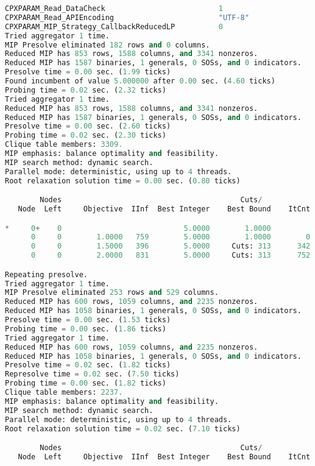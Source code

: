 \begin{lstlisting}[language=Python]
CPXPARAM_Read_DataCheck                          1
CPXPARAM_Read_APIEncoding                        "UTF-8"
CPXPARAM_MIP_Strategy_CallbackReducedLP          0
Tried aggregator 1 time.
MIP Presolve eliminated 182 rows and 0 columns.
Reduced MIP has 853 rows, 1588 columns, and 3341 nonzeros.
Reduced MIP has 1587 binaries, 1 generals, 0 SOSs, and 0 indicators.
Presolve time = 0.00 sec. (1.99 ticks)
Found incumbent of value 5.000000 after 0.00 sec. (4.60 ticks)
Probing time = 0.02 sec. (2.32 ticks)
Tried aggregator 1 time.
Reduced MIP has 853 rows, 1588 columns, and 3341 nonzeros.
Reduced MIP has 1587 binaries, 1 generals, 0 SOSs, and 0 indicators.
Presolve time = 0.00 sec. (2.60 ticks)
Probing time = 0.02 sec. (2.30 ticks)
Clique table members: 3309.
MIP emphasis: balance optimality and feasibility.
MIP search method: dynamic search.
Parallel mode: deterministic, using up to 4 threads.
Root relaxation solution time = 0.00 sec. (0.80 ticks)

        Nodes                                         Cuts/
   Node  Left     Objective  IInf  Best Integer    Best Bound    ItCnt     Gap

*     0+    0                            5.0000        1.0000            80.00%
      0     0        1.0000   759        5.0000        1.0000        0   80.00%
      0     0        1.5000   396        5.0000     Cuts: 313      342   70.00%
      0     0        2.0000   831        5.0000     Cuts: 313      752   60.00%

Repeating presolve.
Tried aggregator 1 time.
MIP Presolve eliminated 253 rows and 529 columns.
Reduced MIP has 600 rows, 1059 columns, and 2235 nonzeros.
Reduced MIP has 1058 binaries, 1 generals, 0 SOSs, and 0 indicators.
Presolve time = 0.00 sec. (1.53 ticks)
Probing time = 0.00 sec. (1.86 ticks)
Tried aggregator 1 time.
Reduced MIP has 600 rows, 1059 columns, and 2235 nonzeros.
Reduced MIP has 1058 binaries, 1 generals, 0 SOSs, and 0 indicators.
Presolve time = 0.02 sec. (1.82 ticks)
Represolve time = 0.02 sec. (7.50 ticks)
Probing time = 0.00 sec. (1.82 ticks)
Clique table members: 2237.
MIP emphasis: balance optimality and feasibility.
MIP search method: dynamic search.
Parallel mode: deterministic, using up to 4 threads.
Root relaxation solution time = 0.02 sec. (7.10 ticks)

        Nodes                                         Cuts/
   Node  Left     Objective  IInf  Best Integer    Best Bound    ItCnt     Gap


\end{lstlisting}
